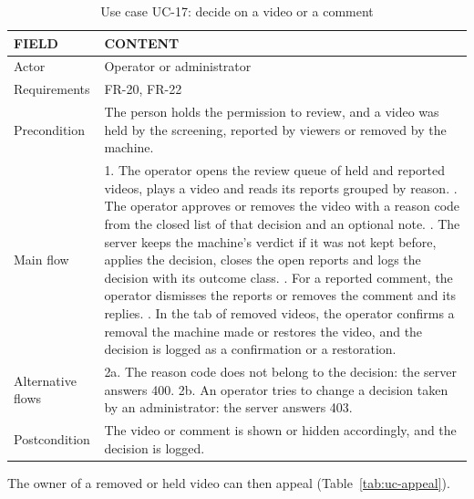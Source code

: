 \begin{table}[H]
\centering
\caption{Use case UC-17: decide on a video or a comment}
\label{tab:uc-decide}
\small
\begin{tabularx}{\textwidth}{p{} X}
\toprule
\textbf{FIELD} & \textbf{CONTENT} \\
\midrule
Actor & Operator or administrator \\
Requirements & FR-20, FR-22 \\
Precondition & The person holds the permission to review, and a video was held by the screening, reported by viewers or removed by the machine. \\
Main flow &
  1. The operator opens the review queue of held and reported videos, plays a video and reads its reports grouped by reason. \newline
  2. The operator approves or removes the video with a reason code from the closed list of that decision and an optional note. \newline
  3. The server keeps the machine's verdict if it was not kept before, applies the decision, closes the open reports and logs the decision with its outcome class. \newline
  4. For a reported comment, the operator dismisses the reports or removes the comment and its replies. \newline
  5. In the tab of removed videos, the operator confirms a removal the machine made or restores the video, and the decision is logged as a confirmation or a restoration. \\
Alternative flows &
  2a. The reason code does not belong to the decision: the server answers 400. \newline
  2b. An operator tries to change a decision taken by an administrator: the server answers 403. \\
Postcondition & The video or comment is shown or hidden accordingly, and the decision is logged. \\
\bottomrule
\end{tabularx}
\end{table}

The owner of a removed or held video can then appeal (Table~\ref{tab:uc-appeal}).

